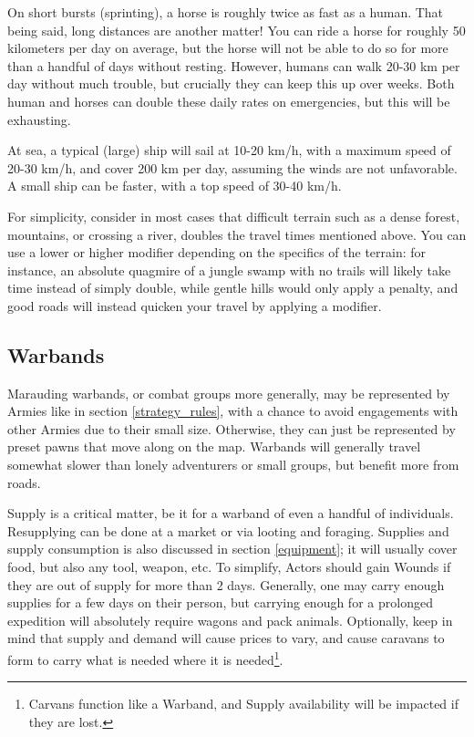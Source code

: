 On short bursts (sprinting), a horse is roughly twice as fast as a human. That being said, long distances are another matter! You can ride a horse for roughly 50 kilometers per day on average, but the horse will not be able to do so for more than a handful of days without resting. However, humans can walk 20-30 km per day without much trouble, but crucially they can keep this up over weeks. Both human and horses can double these daily rates on emergencies, but this will be exhausting.

At sea, a typical (large) ship will sail at 10-20 km/h, with a maximum speed of 20-30 km/h, and cover 200 km per day, assuming the winds are not unfavorable. A small ship can be faster, with a top speed of 30-40 km/h.

For simplicity, consider in most cases that difficult terrain such as a dense forest, mountains, or crossing a river, doubles the travel times mentioned above. You can use a lower or higher modifier depending on the specifics of the terrain: for instance, an absolute quagmire of a jungle swamp with no trails will likely take  time instead of simply double, while gentle hills would only apply a  penalty, and good roads will instead quicken your travel by applying a  modifier.

\subsection{Warbands}

Marauding warbands, or combat groups more generally, may be represented by Armies like in section \ref{strategy_rules}, with a chance to avoid engagements with other Armies due to their small size. Otherwise, they can just be represented by preset pawns that move along on the map. Warbands will generally travel somewhat slower than lonely adventurers or small groups, but benefit more from roads.

Supply is a critical matter, be it for a warband of even a handful of individuals. Resupplying can be done at a market or via looting and foraging. Supplies and supply consumption is also discussed in section \ref{equipment}; it will usually cover food, but also any tool, weapon, etc. To simplify, Actors should gain Wounds if they are out of supply for more than 2 days. Generally, one may carry enough supplies for a few days on their person, but carrying enough for a prolonged expedition will absolutely require wagons and pack animals. Optionally, keep in mind that supply and demand will cause prices to vary, and cause caravans to form to carry what is needed where it is needed\footnote{Carvans function like a Warband, and Supply availability will be impacted if they are lost.}.
	

